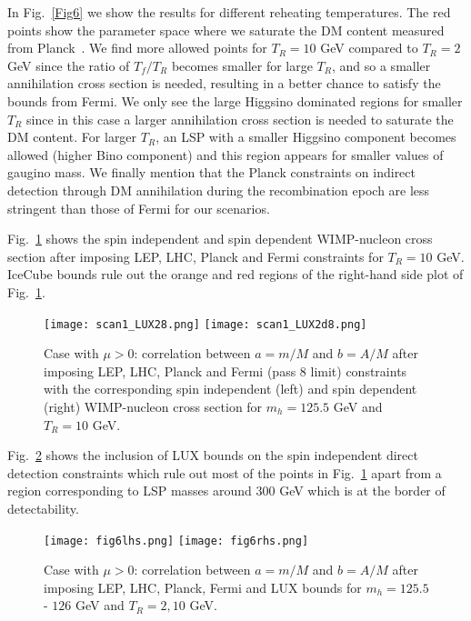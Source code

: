 \documentclass[11pt,a4paper]{article}
\begin{document}
In Fig.~\ref{Fig6} we show the results for different reheating temperatures. The red points show the parameter space where we saturate the DM content measured from Planck~\cite{planck}. We find more allowed points for $T_R=10$ GeV compared to $T_R=2$ GeV since the ratio of $T_f/T_R$ becomes smaller for large $T_R$, and so a smaller annihilation cross section is needed, resulting in a better chance to satisfy the bounds from Fermi. We only see the large Higgsino dominated regions for smaller $T_R$ since in this case a larger annihilation cross section is needed to saturate the DM content. For larger $T_R$, an LSP with a smaller Higgsino component becomes allowed (higher Bino component) and this region appears for smaller values of gaugino mass.
We finally mention that the Planck constraints on indirect detection through DM annihilation during the recombination epoch are less stringent than those of Fermi for our scenarios.

Fig.~\ref{Fig7} shows the spin independent and spin dependent WIMP-nucleon cross section after imposing LEP, LHC, Planck and Fermi constraints for $T_R = 10$ GeV. IceCube bounds rule out the orange and red regions of the right-hand side plot of Fig.~\ref{Fig7}.

\begin{figure}[!ht]
\centering
\texttt{[image: scan1\_LUX28.png]}
\texttt{[image: scan1\_LUX2d8.png]}
\caption{Case with $\mu>0$: correlation between $a=m/M$ and $b=A/M$ after imposing LEP, LHC, Planck and Fermi (pass 8 limit) constraints with the corresponding spin independent (left) and spin dependent (right) WIMP-nucleon cross section for $m_h = 125.5$ GeV and $T_R = 10$ GeV.}
\label{Fig7}
\end{figure}

Fig.~\ref{Fig9} shows the inclusion of LUX bounds on the spin independent direct detection constraints which rule out most of the points in Fig.~\ref{Fig7} apart from a region corresponding to LSP masses around $300$ GeV which is at the border of detectability.

\begin{figure}[!ht]
\centering
\texttt{[image: fig6lhs.png]}
\texttt{[image: fig6rhs.png]}
\caption{Case with $\mu>0$: correlation between $a=m/M$ and $b=A/M$ after imposing LEP, LHC, Planck, Fermi and LUX bounds
for $m_h = 125.5$ - $126$ GeV and $T_R = 2, 10$ GeV.}
\label{Fig9}
\end{figure}
\end{document}
